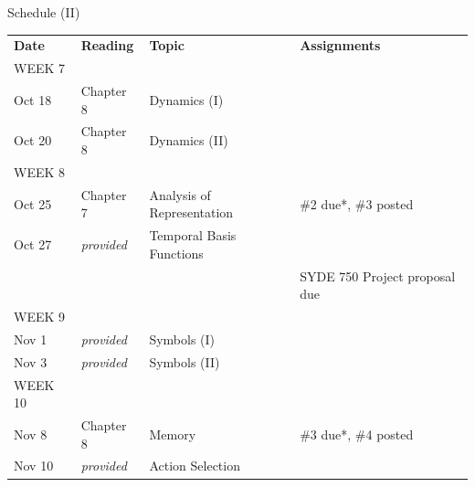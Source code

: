 \documentclass[aspectratio=169]{beamer}
\begin{document}
\begin{frame}{Schedule (II)}
	\small
	\begin{tabular}{p{2cm} p{2cm} p{5cm} p{3cm}}
		\toprule
		\textbf{Date} &	\textbf{Reading} &	\textbf{Topic} & \textbf{Assignments} \\
		
		\tiny WEEK 7 & & & \\
		Oct 18 &
		Chapter 8 &
		Dynamics (I) &
		\\
		Oct 20 &
		Chapter 8 &
		Dynamics (II) &
		\\
		
		\tiny WEEK 8 & & & \\
		Oct 25 &
		Chapter 7 &
		Analysis of Representation &
		\#2 due*, \#3 posted\\
		Oct 27 &
		\emph{provided} &
		Temporal Basis Functions &
		\\
		&
		&
		&
		SYDE 750 Project proposal due\\[0.05cm]
		
		\tiny WEEK 9 & & & \\
		Nov 1 &
		\emph{provided} &
		Symbols (I) &
		\\
		Nov 3 &
		\emph{provided} &
		Symbols (II) &
		\\[0.05cm]
		
		\tiny WEEK 10 & & & \\
		Nov 8 &
		Chapter 8 &
		Memory &
		\#3 due*, \#4 posted\\
		Nov 10 &
		\emph{provided} &
		Action Selection &
		
		\\
		\bottomrule
	\end{tabular}
\end{frame}
\end{document}
